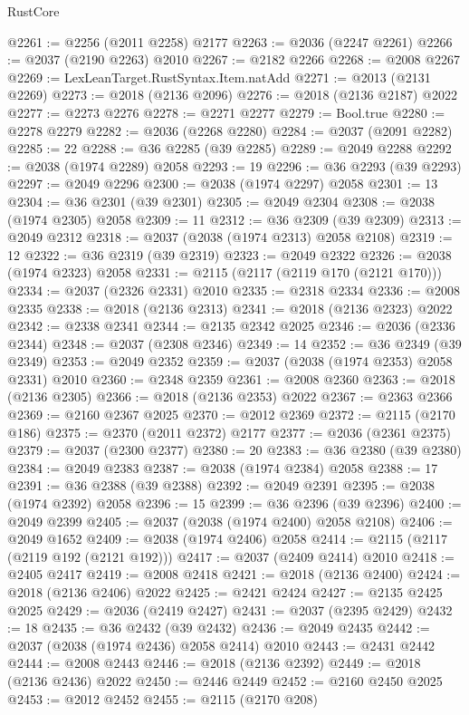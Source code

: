 \begin{lexlean}{RustCore}
\begin{coremodule}
@2261 := @2256 (@2011 @2258) @2177
@2263 := @2036 (@2247 @2261)
@2266 := @2037 (@2190 @2263) @2010
@2267 := @2182 @2266
@2268 := @2008 @2267
@2269 := LexLeanTarget.RustSyntax.Item.natAdd
@2271 := @2013 (@2131 @2269)
@2273 := @2018 (@2136 @2096)
@2276 := @2018 (@2136 @2187) @2022
@2277 := @2273 @2276
@2278 := @2271 @2277
@2279 := Bool.true
@2280 := @2278 @2279
@2282 := @2036 (@2268 @2280)
@2284 := @2037 (@2091 @2282)
@2285 := 22
@2288 := @36 @2285 (@39 @2285)
@2289 := @2049 @2288
@2292 := @2038 (@1974 @2289) @2058
@2293 := 19
@2296 := @36 @2293 (@39 @2293)
@2297 := @2049 @2296
@2300 := @2038 (@1974 @2297) @2058
@2301 := 13
@2304 := @36 @2301 (@39 @2301)
@2305 := @2049 @2304
@2308 := @2038 (@1974 @2305) @2058
@2309 := 11
@2312 := @36 @2309 (@39 @2309)
@2313 := @2049 @2312
@2318 := @2037 (@2038 (@1974 @2313) @2058 @2108)
@2319 := 12
@2322 := @36 @2319 (@39 @2319)
@2323 := @2049 @2322
@2326 := @2038 (@1974 @2323) @2058
@2331 := @2115 (@2117 (@2119 @170 (@2121 @170)))
@2334 := @2037 (@2326 @2331) @2010
@2335 := @2318 @2334
@2336 := @2008 @2335
@2338 := @2018 (@2136 @2313)
@2341 := @2018 (@2136 @2323) @2022
@2342 := @2338 @2341
@2344 := @2135 @2342 @2025
@2346 := @2036 (@2336 @2344)
@2348 := @2037 (@2308 @2346)
@2349 := 14
@2352 := @36 @2349 (@39 @2349)
@2353 := @2049 @2352
@2359 := @2037 (@2038 (@1974 @2353) @2058 @2331) @2010
@2360 := @2348 @2359
@2361 := @2008 @2360
@2363 := @2018 (@2136 @2305)
@2366 := @2018 (@2136 @2353) @2022
@2367 := @2363 @2366
@2369 := @2160 @2367 @2025
@2370 := @2012 @2369
@2372 := @2115 (@2170 @186)
@2375 := @2370 (@2011 @2372) @2177
@2377 := @2036 (@2361 @2375)
@2379 := @2037 (@2300 @2377)
@2380 := 20
@2383 := @36 @2380 (@39 @2380)
@2384 := @2049 @2383
@2387 := @2038 (@1974 @2384) @2058
@2388 := 17
@2391 := @36 @2388 (@39 @2388)
@2392 := @2049 @2391
@2395 := @2038 (@1974 @2392) @2058
@2396 := 15
@2399 := @36 @2396 (@39 @2396)
@2400 := @2049 @2399
@2405 := @2037 (@2038 (@1974 @2400) @2058 @2108)
@2406 := @2049 @1652
@2409 := @2038 (@1974 @2406) @2058
@2414 := @2115 (@2117 (@2119 @192 (@2121 @192)))
@2417 := @2037 (@2409 @2414) @2010
@2418 := @2405 @2417
@2419 := @2008 @2418
@2421 := @2018 (@2136 @2400)
@2424 := @2018 (@2136 @2406) @2022
@2425 := @2421 @2424
@2427 := @2135 @2425 @2025
@2429 := @2036 (@2419 @2427)
@2431 := @2037 (@2395 @2429)
@2432 := 18
@2435 := @36 @2432 (@39 @2432)
@2436 := @2049 @2435
@2442 := @2037 (@2038 (@1974 @2436) @2058 @2414) @2010
@2443 := @2431 @2442
@2444 := @2008 @2443
@2446 := @2018 (@2136 @2392)
@2449 := @2018 (@2136 @2436) @2022
@2450 := @2446 @2449
@2452 := @2160 @2450 @2025
@2453 := @2012 @2452
@2455 := @2115 (@2170 @208)

\end{coremodule}
\end{lexlean}
